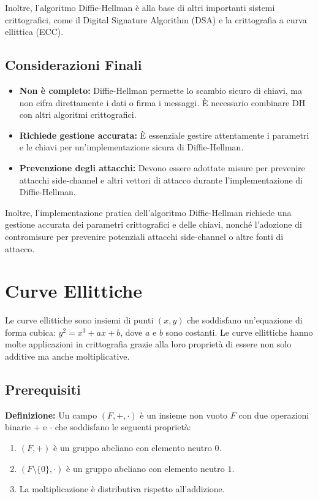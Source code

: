\documentclass[a4paper,12pt]{report}
\begin{document}
Inoltre, l'algoritmo Diffie-Hellman è alla base di altri importanti sistemi crittografici, come il Digital Signature Algorithm (DSA) e la crittografia a curva ellittica (ECC).

\section{Considerazioni Finali}
\begin{itemize}
    \item \textbf{Non è completo:} Diffie-Hellman permette lo scambio sicuro di chiavi, ma non cifra direttamente i dati o firma i messaggi. È necessario combinare DH con altri algoritmi crittografici.
    
    \item \textbf{Richiede gestione accurata:} È essenziale gestire attentamente i parametri e le chiavi per un'implementazione sicura di Diffie-Hellman.
    
    \item \textbf{Prevenzione degli attacchi:} Devono essere adottate misure per prevenire attacchi side-channel e altri vettori di attacco durante l'implementazione di Diffie-Hellman.
\end{itemize}

Inoltre, l'implementazione pratica dell'algoritmo Diffie-Hellman richiede una gestione accurata dei parametri crittografici e delle chiavi, nonché l'adozione di contromisure per prevenire potenziali attacchi side-channel o altre fonti di attacco.
%
%
%
%
%
%
\chapter{Curve Ellittiche}
Le curve ellittiche sono insiemi di punti $(x, y)$ che soddisfano un'equazione di forma cubica: $y^2 = x^3 + ax + b$, dove $a$ e $b$ sono costanti. Le curve ellittiche hanno molte applicazioni in crittografia grazie alla loro proprietà di essere non solo additive ma anche moltiplicative.

\section{Prerequisiti}
\textbf{Definizione:} Un campo \( (F, +, \cdot) \) è un insieme non vuoto \( F \) con due operazioni binarie \( + \) e \( \cdot \) che soddisfano le seguenti proprietà:
\begin{enumerate}
    \item \( (F, +) \) è un gruppo abeliano con elemento neutro \( 0 \).
    \item \( (F \setminus \{0\}, \cdot) \) è un gruppo abeliano con elemento neutro \( 1 \).
    \item La moltiplicazione è distributiva rispetto all'addizione.
\end{enumerate}
\end{document}
